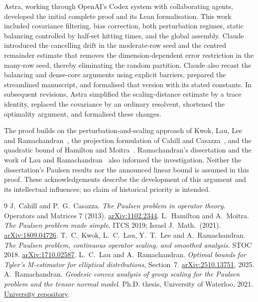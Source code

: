 \documentclass[11pt]{article}
\theoremstyle{definition}
\theoremstyle{remark}
\numberwithin{equation}{section}
\begin{document}
Astra, working through OpenAI's Codex system with collaborating agents,
developed the initial complete proof and its Lean formalisation. This work
included covariance filtering, bias correction, both perturbation regimes,
static balancing controlled by half-set hitting times, and the global
assembly. Claude introduced the cancelling drift in the moderate-row seed
and the centred remainder estimate that removes the dimension-dependent error
restriction in the many-row seed, thereby eliminating the random partition.
Claude also recast the balancing and dense-core arguments using explicit
barriers, prepared the streamlined manuscript, and formalised that version
with its stated constants. In subsequent revisions, Astra simplified the
scaling-distance estimate by a trace identity, replaced the covariance by an
ordinary resolvent, shortened the optimality argument, and formalised these
changes.

The proof builds on the perturbation-and-scaling approach of Kwok, Lau, Lee
and Ramachandran~\cite{KLLR}, the projection formulation of Cahill and
Casazza~\cite{CC}, and the quadratic bound of Hamilton and Moitra~\cite{HM}.
Ramachandran's dissertation and the work of Lau and
Ramachandran~\cite{RamThesis,LR} also informed the investigation. Neither the
dissertation's Paulsen results nor the announced linear bound is assumed in
this proof. These acknowledgements describe
the development of this argument and its intellectual influences; no claim of
historical priority is intended.

\begin{thebibliography}{9}
J.~Cahill and P.~G.~Casazza.
\emph{The Paulsen problem in operator theory}.
Operators and Matrices 7 (2013).
\href{https://arxiv.org/abs/1102.2344}{arXiv:1102.2344}.
L.~Hamilton and A.~Moitra.
\emph{The Paulsen problem made simple}.
ITCS 2019; Israel J.\ Math.\ (2021).
\href{https://arxiv.org/abs/1809.04726}{arXiv:1809.04726}.
T.~C.~Kwok, L.~C.~Lau, Y.~T.~Lee and A.~Ramachandran.
\emph{The Paulsen problem, continuous operator scaling, and smoothed analysis}.
STOC 2018.
\href{https://arxiv.org/abs/1710.02587}{arXiv:1710.02587}.
L.~C.~Lau and A.~Ramachandran.
\emph{Optimal bounds for Tyler's M-estimator for elliptical distributions},
Section~7.
\href{https://arxiv.org/abs/2510.13751}{arXiv:2510.13751}, 2025.
A.~Ramachandran.
\emph{Geodesic convex analysis of group scaling for the Paulsen problem
and the tensor normal model}.
Ph.D. thesis, University of Waterloo, 2021.
\href{https://uwspace.uwaterloo.ca/handle/10012/17710}{University repository}.
\end{thebibliography}
\end{document}
